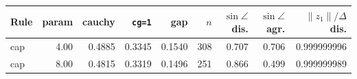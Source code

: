 \begin{tabular}{@{}lrrrrrrrr@{}}
\toprule
Rule & param & cauchy & \texttt{cg=1} & gap & $n$ & $\sin\angle$ dis. & $\sin\angle$ agr. & $\|z_1\|/\Delta$ dis. \\ 
\midrule
cap & 4.00 & 0.4885 & 0.3345 & 0.1540 & 308 & 0.707 & 0.706 & 0.999999996 \\ 
cap & 8.00 & 0.4815 & 0.3319 & 0.1496 & 251 & 0.866 & 0.499 & 0.999999989 \\ 
\bottomrule
\end{tabular}
